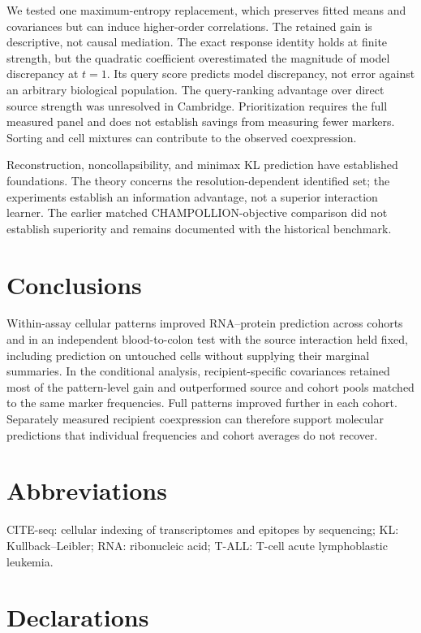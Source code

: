 \documentclass[pdflatex,sn-vancouver-num,iicol]{sn-jnl}
\begin{document}
We tested one maximum-entropy replacement, which preserves fitted means and
covariances but can induce higher-order correlations. The retained
gain is descriptive, not causal mediation. The exact response identity holds
at finite strength, but the quadratic coefficient overestimated the magnitude
of model discrepancy at $t=1$. Its query score predicts model discrepancy, not
error against an arbitrary biological population. The query-ranking advantage over direct source strength
was unresolved in Cambridge. Prioritization requires the full measured panel
and does not establish savings from measuring fewer markers. Sorting and cell
mixtures can contribute to the observed coexpression.

Reconstruction, noncollapsibility, and minimax KL prediction have established
foundations. The theory concerns the resolution-dependent identified set;
the experiments establish an information advantage, not a superior interaction
learner. The earlier matched CHAMPOLLION-objective comparison did not establish
superiority and remains documented with the historical benchmark.

\section{Conclusions}
Within-assay cellular patterns improved RNA--protein prediction across cohorts
and in an independent blood-to-colon test with the source interaction held
fixed, including prediction on untouched cells without supplying their marginal summaries.
In the conditional analysis, recipient-specific
covariances retained most of the pattern-level gain and outperformed source and cohort
pools matched to the same marker frequencies. Full patterns improved further
in each cohort. Separately measured recipient coexpression can therefore
support molecular predictions that individual frequencies and cohort averages
do not recover.


\section*{Abbreviations}
CITE-seq: cellular indexing of transcriptomes and epitopes by sequencing;
KL: Kullback--Leibler; RNA: ribonucleic acid;
T-ALL: T-cell acute lymphoblastic leukemia.

\section*{Declarations}
\end{document}
